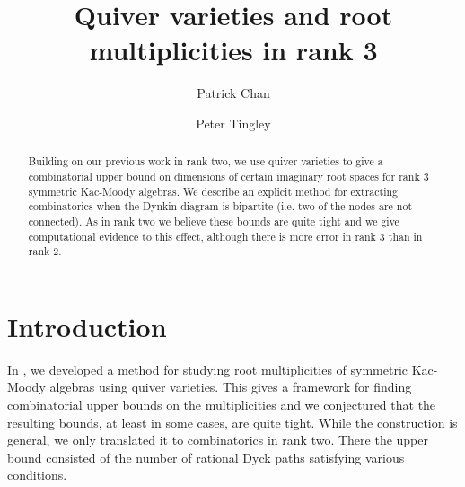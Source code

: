 \documentclass{amsart}
\numberwithin{equation}{section}
\numberwithin{figure}{section}
\numberwithin{table}{section}
\theoremstyle{definition}
\begin{document}
\title[A quiver variety approach to root multiplicities]{Quiver varieties and root multiplicities in rank 3}


\author{Patrick Chan}
\address{Department of Mathematics and Statistics, Loyola University, Chicago, IL}

\author{Peter Tingley}
\address{Department of Mathematics and Statistics, Loyola University, Chicago, IL}

 
\begin{abstract}
Building on our previous work in rank two, we use quiver varieties to give a combinatorial upper bound on dimensions of certain imaginary root spaces for rank 3 symmetric Kac-Moody algebras. We describe an explicit method for extracting combinatorics when the Dynkin diagram is bipartite (i.e. two of the nodes are not connected). As in rank two we believe these bounds are quite tight and we give computational evidence to this effect, although there is more error in rank 3 than in rank 2. 
\end{abstract}
 
\maketitle

\section{Introduction}
In \cite{T21}, we developed a method for studying root multiplicities of symmetric Kac-Moody algebras using quiver varieties. This gives a framework for finding combinatorial upper bounds on the multiplicities and we conjectured that the resulting bounds, at least in some cases, are quite tight. While the construction is general, we only translated it to combinatorics in rank two. There the upper bound consisted of the number of rational Dyck paths satisfying various conditions. 
\end{document}
